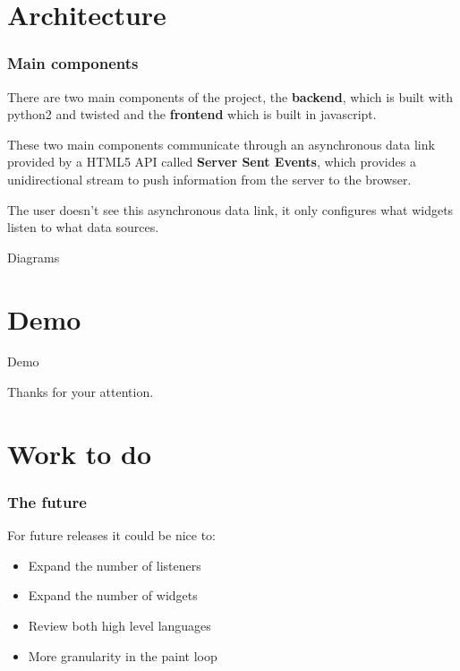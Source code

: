\documentclass{beamer}
\begin{document}
    \section{Architecture}
    \begin{frame}
        \frametitle{Main components}
        There are two main components of the project, the \textbf{backend},
        which is built with python2 and twisted and the \textbf{frontend}
        which is built in javascript.

        These two main components communicate through an asynchronous data link
        provided by a HTML5 API called \textbf{Server Sent Events}, which
        provides a unidirectional stream to push information from the server to
        the browser.

        The user doesn't see this asynchronous data link, it only configures
        what widgets listen to what data sources.
    \end{frame}

    \begin{frame}
    \Huge{\centerline{Diagrams}}
    \end{frame}

    \section{Demo}
    \begin{frame}
    \Huge{\centerline{Demo}}
    \end{frame}

    \begin{frame}
    \Huge{\centerline{Thanks for your attention.}}
    \end{frame}

    \section{Work to do}
    \begin{frame}
        \frametitle{The future}
        For future releases it could be nice to:
        \begin{itemize}
            \item Expand the number of listeners
            \item Expand the number of widgets
            \item Review both high level languages
            \item More granularity in the paint loop
        \end{itemize}
    \end{frame}
\end{document}

